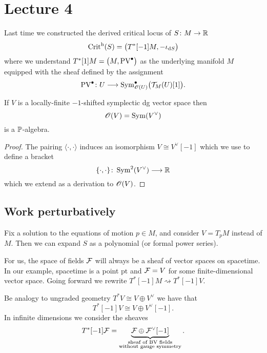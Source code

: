 \chapter{Lecture 4}

Last time we constructed the derived critical locus of $S \colon M \to \mathbb{R}$
\begin{equation*}
  \operatorname{Crit}^{\mathrm{h}}(S) = \bigl( T^*[-1] M, - \iota_{\mathrm{d} S} \bigr)
\end{equation*}
where we understand $T^*[1] M = \bigl( M, \operatorname{PV}^\bullet \bigr)$ as the underlying manifold $M$ equipped with the sheaf defined by the assignment
\begin{equation*}
  \operatorname{PV}^\bullet \colon U \longrightarrow
  \operatorname{Sym}_{\mathscr{O}(U)}^\bullet \bigl( \mathcal{T}_M (U) [1] \bigr).
\end{equation*}

\begin{proposition}
    If $V$ is a locally-finite $-1$-shifted symplectic dg vector space then
    \begin{equation*}
      \mathscr{O}(V) = \operatorname{Sym}(V^\vee)
    \end{equation*}
    is a $\mathbb{P}$-algebra.
\end{proposition}
\begin{proof}
  The pairing $\langle \cdot, \cdot \rangle$ induces an isomorphism $V \cong V^\vee[-1]$ which we use to define a bracket
  \begin{equation*}
    \{\cdot, \cdot\} \colon \operatorname{Sym}^2(V^\vee) \longrightarrow \mathbb{R}
  \end{equation*}
  which we extend as a derivation to $\mathscr{O}(V)$.
\end{proof}

\section{Work perturbatively}

Fix a solution to the equations of motion $p \in M$, and consider $V = T_p M$ instead of $M$.
Then we can expand $S$ as a polynomial (or formal power series).

For us, the space of fields $\mathcal{F}$ will always be a sheaf of vector spaces on spacetime.
In our example, spacetime is a point $\text{pt}$ and $\mathcal{F} = V$ for some finite-dimensional vector space.
Going forward we rewrite $T^* [-1]M \rightsquigarrow T^* [-1]V$.

\begin{remark}
  Be analogy to ungraded geometry $T^*V \cong V \oplus V^\vee$ we have that
  \begin{equation*}
    T^* [-1]V \cong V \oplus V^\vee [-1].
  \end{equation*}
  In infinite dimensions we consider the sheaves
  \begin{equation*}
    T^*[-1] \mathcal{F}
    = \underbrace{\mathcal{F} \oplus  \mathcal{F}^{\vee}[-1]}_{\substack{
    \text{sheaf of BV fields}\\\text{without gauge symmetry}}}.
  \end{equation*}
\end{remark}

